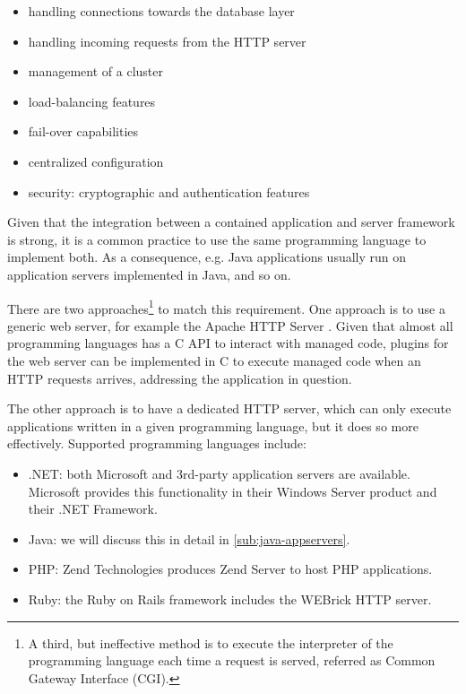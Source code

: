\begin{itemize}
\item handling connections towards the database layer
\item handling incoming requests from the HTTP server
\item management of a cluster
\item load-balancing features
\item fail-over capabilities
\item centralized configuration
\item security: cryptographic and authentication features
\end{itemize}

Given that the integration between a contained application and server framework
is strong, it is a common practice to use the same programming language to
implement both. As a consequence, e.g. Java applications usually run on
application servers implemented in Java, and so on.

There are two approaches\footnote{A third, but ineffective method is to
execute the interpreter of the programming language each time a request is
served, referred as Common Gateway Interface (CGI).} to match this requirement.
One approach is to use a generic web server, for example the Apache HTTP
Server \cite{apache-httpd}. Given that almost all programming languages has a C
API to interact with managed code, plugins for the web server can be
implemented in C to execute managed code when an HTTP requests arrives,
addressing the application in question.

The other approach is to have a dedicated HTTP server, which can only execute
applications written in a given programming language, but it does so more
effectively. Supported programming languages include:

\begin{itemize}
\item .NET: both Microsoft and 3rd-party application servers are available.
Microsoft provides this functionality in their Windows Server product and their
.NET Framework.
\item Java: we will discuss this in detail in \autoref{sub:java-appservers}.
\item PHP: Zend Technologies produces Zend Server to host PHP applications.
\item Ruby: the Ruby on Rails framework includes the WEBrick HTTP server.
\end{itemize}

\label{sub:java-appservers}

